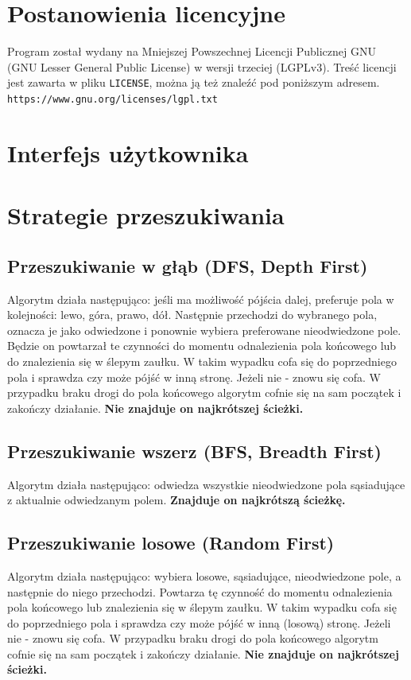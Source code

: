 \documentclass[12pt,a4paper]{article}
\begin{document}
	
	\section{Postanowienia licencyjne}	
	Program został wydany na Mniejszej Powszechnej Licencji Publicznej GNU 
	(GNU Lesser General Public License) w wersji trzeciej (LGPLv3). Treść
	licencji jest zawarta w pliku \texttt{LICENSE}, można ją też znaleźć
	pod poniższym adresem.\\
	\texttt{https://www.gnu.org/licenses/lgpl.txt}
	
	\section{Interfejs użytkownika}
	
	\section{Strategie przeszukiwania}
	\subsection{Przeszukiwanie w głąb (DFS, Depth First)}
	Algorytm działa następująco: jeśli ma możliwość pójścia dalej,
	preferuje pola w kolejności: lewo, góra, prawo, dół. Następnie 
	przechodzi do wybranego pola, oznacza je jako odwiedzone i ponownie
	wybiera preferowane nieodwiedzone pole. 
	Będzie on powtarzał te czynności do momentu odnalezienia 
	pola końcowego lub do znalezienia się w ślepym zaułku. W takim	
	wypadku cofa się do poprzedniego pola i sprawdza czy może pójść w 
	inną stronę. Jeżeli nie - znowu się cofa. W przypadku braku
	drogi do pola końcowego algorytm cofnie się na sam początek i
	zakończy działanie. \textbf{Nie znajduje on najkrótszej ścieżki.}
	
	\subsection{Przeszukiwanie wszerz (BFS, Breadth First)}
	Algorytm działa następująco: odwiedza wszystkie nieodwiedzone pola
	sąsiadujące z aktualnie odwiedzanym polem.
	\textbf{Znajduje on najkrótszą ścieżkę.}
	
	\subsection{Przeszukiwanie losowe (Random First)}
	Algorytm działa następująco: wybiera losowe, sąsiadujące, nieodwiedzone pole,
	a następnie do niego przechodzi. Powtarza tę czynność do momentu
	odnalezienia pola końcowego lub znalezienia się w ślepym zaułku. W 
	takim wypadku cofa się do poprzedniego pola i sprawdza czy może
	pójść w inną (losową) stronę. Jeżeli nie - znowu się cofa. W 
	przypadku braku drogi do pola końcowego algorytm cofnie się na sam 
	początek i zakończy działanie. \textbf{Nie znajduje on najkrótszej 
	ścieżki.}
	
\end{document}
